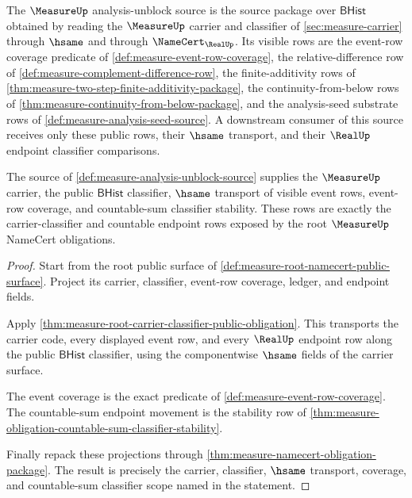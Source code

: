 \begin{definition}
\label{def:measure-analysis-unblock-source}
The $\MeasureUp$ analysis-unblock source is the source package over
$\mathsf{BHist}$ obtained by reading the $\MeasureUp$ carrier and classifier
of \autoref{sec:measure-carrier} through $\hsame$ and through
$\NameCert_{\RealUp}$. Its visible rows are the event-row coverage predicate
of \autoref{def:measure-event-row-coverage}, the relative-difference row of
\autoref{def:measure-complement-difference-row}, the finite-additivity rows
of \autoref{thm:measure-two-step-finite-additivity-package}, the
continuity-from-below rows of
\autoref{thm:measure-continuity-from-below-package}, and the
analysis-seed substrate rows of
\autoref{def:measure-analysis-seed-source}. A downstream consumer of this
source receives only these public rows, their $\hsame$ transport, and their
$\RealUp$ endpoint classifier comparisons.
\end{definition}

\begin{theorem}
\label{thm:measure-analysis-unblock-carrier-classifier-scope}
The source of \autoref{def:measure-analysis-unblock-source} supplies the
$\MeasureUp$ carrier, the public $\mathsf{BHist}$ classifier, $\hsame$
transport of visible event rows, event-row coverage, and countable-sum
classifier stability. These rows are exactly the carrier-classifier and
countable endpoint rows exposed by the root $\MeasureUp$ NameCert obligations.
\end{theorem}
\begin{proof}
Start from the root public surface of
\autoref{def:measure-root-namecert-public-surface}. Project its carrier,
classifier, event-row coverage, ledger, and endpoint fields.

Apply \autoref{thm:measure-root-carrier-classifier-public-obligation}. This
transports the carrier code, every displayed event row, and every $\RealUp$
endpoint row along the public $\mathsf{BHist}$ classifier, using the
componentwise $\hsame$ fields of the carrier surface.

The event coverage is the exact predicate of
\autoref{def:measure-event-row-coverage}. The countable-sum endpoint movement
is the stability row of
\autoref{thm:measure-obligation-countable-sum-classifier-stability}.

Finally repack these projections through
\autoref{thm:measure-namecert-obligation-package}. The result is precisely
the carrier, classifier, $\hsame$ transport, coverage, and countable-sum
classifier scope named in the statement.
\end{proof}

